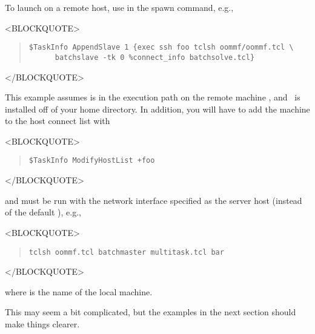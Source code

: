 To launch  on a remote host, use 
in the spawn command, e.g.,
\begin{rawhtml}
<BLOCKQUOTE>
\end{rawhtml}
\begin{quote}
\begin{verbatim}
$TaskInfo AppendSlave 1 {exec ssh foo tclsh oommf/oommf.tcl \
      batchslave -tk 0 %connect_info batchsolve.tcl}
\end{verbatim}
\end{quote}
\begin{rawhtml}
</BLOCKQUOTE>
\end{rawhtml}
This example assumes  is in the execution path on the remote
machine , and \OOMMF\ is installed off of your home directory.
In addition, you will have to add the machine \fn{foo} to the host
connect list with
\begin{rawhtml}
<BLOCKQUOTE>
\end{rawhtml}
\begin{quote}
\begin{verbatim}
$TaskInfo ModifyHostList +foo
\end{verbatim}
\end{quote}
\begin{rawhtml}
</BLOCKQUOTE>
\end{rawhtml}
and  must be run with the network interface specified
as the server host (instead of the default \fn{localhost}), e.g.,
\begin{rawhtml}
<BLOCKQUOTE>
\end{rawhtml}
\begin{quote}
\begin{verbatim}
tclsh oommf.tcl batchmaster multitask.tcl bar
\end{verbatim}
\end{quote}
\begin{rawhtml}
</BLOCKQUOTE>
\end{rawhtml}
where  is the name of the local machine.

This may seem a bit complicated, but the examples in the
next section should make things clearer.

